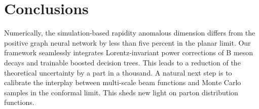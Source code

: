 \section{Conclusions}\label{sec:conclusions}

Numerically, the simulation-based rapidity anomalous dimension differs
from the positive graph neural network by less than five percent in the
planar limit. Our framework seamlessly integrates Lorentz-invariant
power corrections of B meson decays and trainable boosted decision
trees. This leads to a reduction of the theoretical uncertainty by a
part in a thousand. A natural next step is to calibrate the interplay
between multi-scale beam functions and Monte Carlo samples in the
conformal limit. This sheds new light on parton distribution functions.

